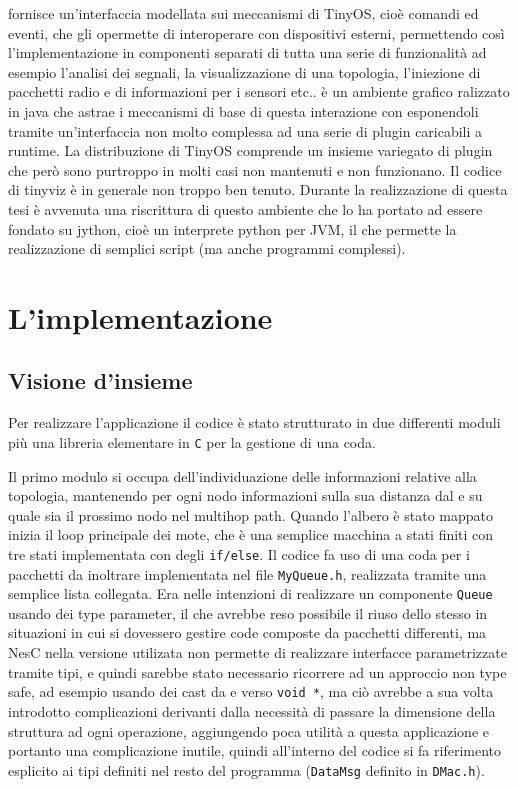 \documentclass[twoside,11pt,a4paper,italian,openany]{book}
\begin{document}
\tos fornisce un'interfaccia modellata sui meccanismi di TinyOS, cioè comandi ed eventi, 
che gli opermette di interoperare con dispositivi esterni, permettendo così l'implementazione in componenti separati di tutta una serie di funzionalità ad esempio l'analisi dei segnali, la visualizzazione di una topologia, l'iniezione di pacchetti radio e di informazioni per i sensori etc.. 
\tv è un ambiente grafico ralizzato in java che astrae i meccanismi di base di questa 
interazione con \tos esponendoli tramite un'interfaccia non molto complessa ad una serie 
di plugin caricabili a runtime.  
La distribuzione di TinyOS comprende un insieme variegato di plugin che 
però sono purtroppo in molti casi non mantenuti e non funzionano. Il codice di tinyviz è 
in generale non troppo ben tenuto. 
Durante la realizzazione di questa tesi è avvenuta una riscrittura di questo ambiente che lo ha 
portato ad essere fondato su jython\cite{tython}, cioè un interprete python per JVM, 
il che permette la realizzazione di semplici script (ma anche programmi complessi).
 

\chapter{L'implementazione}
\section{Visione d'insieme}
Per realizzare l'applicazione il codice è stato strutturato in due differenti moduli più 
una libreria elementare in \texttt{C} per la gestione di una coda.

Il primo modulo si occupa dell'individuazione delle informazioni relative alla topologia, 
mantenendo per ogni nodo informazioni sulla sua distanza dal \sink e su quale sia il prossimo 
nodo nel multihop path.  
Quando l'albero è stato mappato inizia il loop principale dei mote, che è una 
semplice macchina a stati finiti con tre stati implementata con degli \texttt{if/else}.
Il codice fa uso di una coda per i pacchetti da inoltrare implementata nel file \texttt{MyQueue.h}, realizzata tramite una semplice lista collegata.
Era nelle intenzioni di realizzare un componente \texttt{Queue} usando dei type parameter, 
il che avrebbe reso possibile il riuso dello stesso in situazioni in cui si dovessero gestire 
code composte da pacchetti differenti, ma NesC nella versione utilizata non permette di 
realizzare interfacce parametrizzate tramite tipi, e quindi sarebbe stato necessario ricorrere 
ad un approccio non type safe, ad esempio usando dei cast da e verso \texttt{void *}, ma ciò 
avrebbe a sua volta introdotto complicazioni derivanti dalla necessità di passare la dimensione 
della struttura ad ogni operazione, aggiungendo poca utilità a questa applicazione e portanto 
una complicazione inutile, quindi all'interno del codice si fa riferimento esplicito ai tipi 
definiti nel resto del programma (\texttt{DataMsg} definito in \texttt{DMac.h}).
\end{document}
